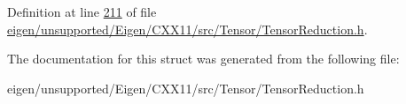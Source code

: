 Definition at line \hyperlink{eigen_2unsupported_2_eigen_2_c_x_x11_2src_2_tensor_2_tensor_reduction_8h_source_l00211}{211} of file \hyperlink{eigen_2unsupported_2_eigen_2_c_x_x11_2src_2_tensor_2_tensor_reduction_8h_source}{eigen/unsupported/\+Eigen/\+C\+X\+X11/src/\+Tensor/\+Tensor\+Reduction.\+h}.



The documentation for this struct was generated from the following file\+:\begin{DoxyCompactItemize}
\item 
eigen/unsupported/\+Eigen/\+C\+X\+X11/src/\+Tensor/\+Tensor\+Reduction.\+h\end{DoxyCompactItemize}
